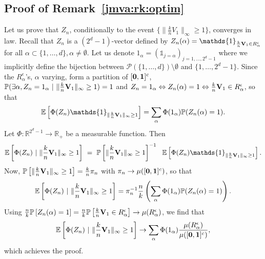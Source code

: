 \subsection{Proof of Remark~\ref{jmva:rk:optim}}
Let us prove that $Z_n$, conditionally to the event $\{\|\frac{k}{n} V_1\|_\infty \ge 1\}$, converges in law.
Recall that $Z_n$ is a $(2^d-1)$-vector defined by $Z_n(\alpha)=\mathds{1}_{\frac{k}{n} \mb V_1 \in R_\alpha^\epsilon}$ for all $\alpha \subset \{1,\ldots,d\}, \alpha \neq \emptyset$.
Let us denote $1_\alpha = (\mathds{1}_{j=\alpha})_{j=1,\ldots, 2^d-1}$ where we implicitly define the bijection between $\mathcal{P}(\{1,\ldots,d\}) \setminus \emptyset$ and $\{1,\ldots,2^d-1\}$.
Since the $R_\alpha^\epsilon$'s, $\alpha$ varying, form a partition of $[\mathbf 0, \mathbf 1]^c$,
$\mathbb{P}(\exists \alpha, Z_n = 1_\alpha ~|~\|\frac{k}{n} \mathbf V_1 \|_\infty \ge 1)=1$ and 
$Z_n = 1_\alpha \Leftrightarrow Z_n(\alpha) = 1 \Leftrightarrow \frac{k}{n} \mathbf V_1 \in R_\alpha^\epsilon$, so that
%
$$\mathbb{E}\left[\Phi(Z_n) \mathds{1}_{\|\frac{k}{n} \mb V_1 \|_\infty \ge 1}\right] = \sum_\alpha \Phi(1_\alpha) \mathbb{P}(Z_n(\alpha) = 1).$$
%
\noindent
Let $\Phi: \mathbb{R}^{2^d-1} \to \mathbb{R}_+$ be a measurable function. Then
\begin{align*}
\mathbb{E}\left[\Phi(Z_n) ~|~ \|\frac{k}{n} \mb V_1 \|_\infty \ge 1\right] ~=~ \mathbb{P}\left[\|\frac{k}{n} \mb V_1 \|_\infty \ge 1\right]^{-1}~~ \mathbb{E}\left[\Phi(Z_n) \mathds{1}_{\|\frac{k}{n} \mb V_1 \|_\infty \ge 1}\right].
\end{align*}
Now, $\mathbb{P}\left[\|\frac{k}{n} \mathbf V_1 \|_\infty \ge 1\right] = \frac{k}{n} \pi_n$ with $\pi_n \to \mu([\mathbf 0, \mathbf 1]^c)$, so that
$$\mathbb{E}\left[\Phi(Z_n) ~|~ \|\frac{k}{n} \mathbf V_1 \|_\infty \ge 1\right] = \pi_n^{-1} \frac{n}{k}\left(\sum_\alpha \Phi(1_\alpha) \mathbb{P}(Z_n(\alpha) = 1) \right).$$
Using $\frac{n}{k} \mathbb{P}\left[Z_n(\alpha)=1\right] = \frac{n}{k}\mathbb{P}\left[\frac{k}{n} \mathbf V_1 \in R_\alpha^\epsilon\right] \to \mu(R_\alpha^\epsilon)$, we find that
%
$$\mathbb{E}\left[\Phi(Z_n) ~|~ \|\frac{k}{n} \mathbf V_1 \|_\infty \ge 1\right] \to \sum_\alpha \Phi(1_\alpha) \frac{\mu(R_\alpha^\epsilon)}{\mu([\mathbf 0, \mathbf 1]^c)},$$
which achieves the proof.


